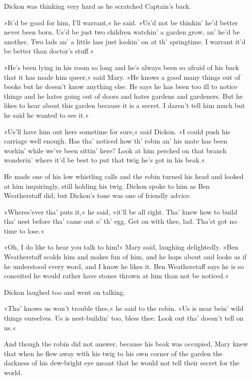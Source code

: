 Dickon was thinking very hard as he scratched Captain's back.

»It'd be good for him, I'll warrant,« he said. »Us'd not be thinkin' he'd better never been born. Us'd be just two children watchin' a garden grow, an' he'd be another. Two lads an' a little lass just lookin' on at th' springtime. I warrant it'd be better than doctor's stuff.«

»He's been lying in his room so long and he's always been so afraid of his back that it has made him queer,« said Mary. »He knows a good many things out of books but he doesn't know anything else. He says he has been too ill to notice things and he hates going out of doors and hates gardens and gardeners. But he likes to hear about this garden because it is a secret. I daren't tell him much but he said he wanted to see it.«

»Us'll have him out here sometime for sure,« said Dickon. »I could push his carriage well enough. Has tha' noticed how th' robin an' his mate has been workin' while we've been sittin' here? Look at him perched on that branch wonderin' where it'd be best to put that twig he's got in his beak.«

He made one of his low whistling calls and the robin turned his head and looked at him inquiringly, still holding his twig. Dickon spoke to him as Ben Weatherstaff did, but Dickon's tone was one of friendly advice.

»Wheres'ever tha' puts it,« he said, »it'll be all right. Tha' knew how to build tha' nest before tha' came out o' th' egg. Get on with thee, lad. Tha'st got no time to lose.«

»Oh, I do like to hear you talk to him!« Mary said, laughing delightedly. »Ben Weatherstaff scolds him and makes fun of him, and he hops about and looks as if he understood every word, and I know he likes it. Ben Weatherstaff says he is so conceited he would rather have stones thrown at him than not be noticed.«

Dickon laughed too and went on talking.

»Tha' knows us won't trouble thee,« he said to the robin. »Us is near bein' wild things ourselves. Us is nest-buildin' too, bless thee. Look out tha' doesn't tell on us.«

And though the robin did not answer, because his beak was occupied, Mary knew that when he flew away with his twig to his own corner of the garden the darkness of his dew-bright eye meant that he would not tell their secret for the world.